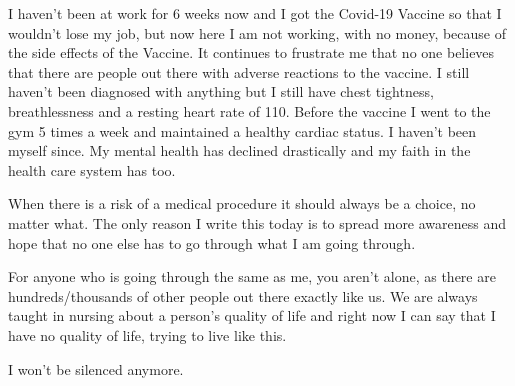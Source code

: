 I haven’t been at work for 6 weeks now and I got the Covid-19 Vaccine so that I
wouldn’t lose my job, but now here I am not working, with no money, because of
the side effects of the Vaccine. It continues to frustrate me that no one
believes that there are people out there with adverse reactions to the
vaccine. I still haven’t been diagnosed with anything but I still have chest
tightness, breathlessness and a resting heart rate of 110. Before the vaccine I
went to the gym 5 times a week and maintained a healthy cardiac status. I
haven’t been myself since. My mental health has declined drastically and my
faith in the health care system has too.

When there is a risk of a medical procedure it should always be a choice, no
matter what. The only reason I write this today is to spread more awareness and
hope that no one else has to go through what I am going through.

For anyone who is going through the same as me, you aren’t alone, as there are
hundreds/thousands of other people out there exactly like us. We are always
taught in nursing about a person’s quality of life and right now I can say that
I have no quality of life, trying to live like this.

I won’t be silenced anymore.

